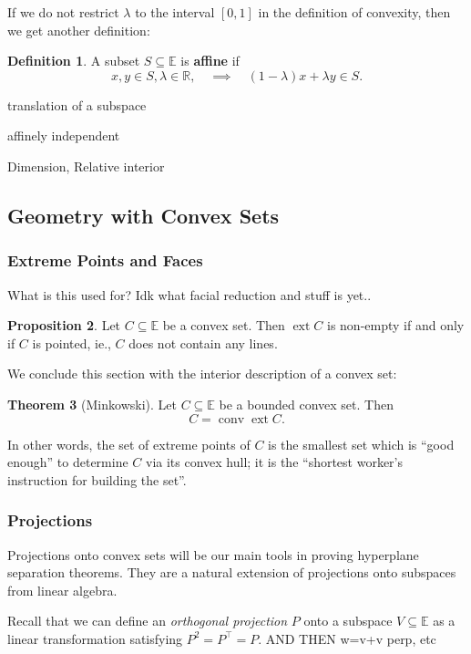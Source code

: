 \documentclass{article}
\numberwithin{equation}{section}
\theoremstyle{definition}
\newtheorem{theorem}{Theorem}[section]
\newtheorem{proposition}[theorem]{Proposition}
\newtheorem{definition}[theorem]{Definition}%
\newcommand{\bE}{\mathbb{E}}
\newcommand{\bR}{\mathbb{R}}
\newcommand{\conv}{\operatorname{conv}}
\newcommand{\ext}{\operatorname{ext}}
\begin{document}
If we do not restrict $\lambda$ to the interval $[0,1]$ in the definition of convexity, then we get another definition:
\begin{definition}
    \label{defaffine}%
    A subset $S\subseteq\bE$ is \textbf{affine} if
    \begin{equation} \label{defaffineeq}%
    x, y\in S, \lambda\in\bR,\quad\implies\quad (1-\lambda)x+\lambda y\in S.\end{equation}
\end{definition}

translation of a subspace

affinely independent

Dimension, Relative interior
\subsection{Geometry with Convex Sets}
\subsubsection{Extreme Points and Faces}
What is this used for? Idk what facial reduction and stuff is yet..
\begin{proposition}
    Let $C\subseteq\bE$ be a convex set. Then $\ext C$ is non-empty if and only if $C$ is pointed, ie., $C$ does not contain any lines.
\end{proposition}

We conclude this section with the interior description of a convex set:
\begin{theorem}[Minkowski]
    Let $C\subseteq\bE$ be a bounded convex set. Then
    \begin{equation}
        C = \conv\ext C.
    \end{equation}
\end{theorem}
In other words, the set of extreme points of $C$ is the smallest set which is ``good enough'' to determine $C$ via its convex hull; it is the ``shortest worker's instruction for building the set''. 
\subsubsection{Projections}
Projections onto convex sets will be our main tools in proving hyperplane separation theorems. They are a natural extension of projections onto subspaces from linear algebra.

Recall that we can define an \textit{orthogonal projection} $P$ onto a subspace $V\subseteq\bE$ as a linear transformation satisfying $P^2=P^\top=P$. AND THEN w=v+v perp, etc
\end{document}
